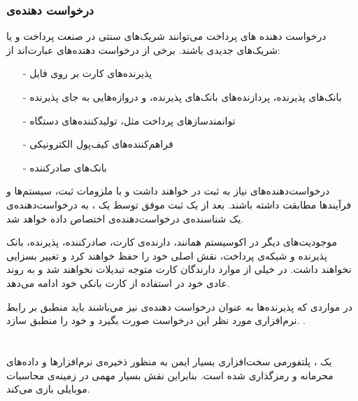\documentclass[oneside]{report}
\begin{document}
\subsubsection{درخواست دهنده‌ی     {\small {}}}
درخواست دهنده ‌های 
{\normalsize {}}
پرداخت می‌توانند شریک‌های سنتی در صنعت پرداخت و یا شریک‌های جدیدی باشند. برخی از درخواست دهنده‌های 
{\normalsize {}}
عبارت‌اند از: 
\begin{itemize}
	\item[-] پذیرنده‌های کارت بر روی فایل
	\item[-]بانک‌های پذیرنده،  پردازنده‌های بانک‌های پذیرنده،  و دروازه‌هایی به جای پذیرنده
	\item[-]توانمندسازهای پرداخت مثل، 
	تولیدکننده‌های دستگاه
	{\normalsize {}}
	\item[-]فراهم‌کننده‌های کیف‌پول الکترونیکی
	\item[-] بانک‌های صادرکننده 
\end{itemize}
درخواست‌دهنده‌های 
{\normalsize {}}
نیاز به ثبت در 
{\normalsize {}}
خواهند داشت و با ملزومات ثبت،  سیستم‌ها و فرآیندها مطابقت داشته باشند. بعد از یک ثبت موفق توسط یک 
{\normalsize {}}
، به درخواست‌دهنده‌ی 
{\normalsize {}}
یک شناسنده‌ی درخواست‌دهنده‌ی 
{\normalsize {}}
اختصاص داده خواهد شد. 

موجودیت‌‌های دیگر در اکوسیستم 
			{\normalsize {}}
همانند،   دارنده‌ی کارت،   صادرکننده، پذیرنده،   بانک پذیرنده و شبکه‌ی پرداخت، نقش اصلی خود را حفظ خواهند کرد و تغییر بسزایی نخواهند داشت. در خیلی از موارد دارندگان کارت متوجه تبدیلات  
{\normalsize {}}
نخواهند شد و به روند عادی خود در استفاده از کارت بانکی خود ادامه می‌دهد.

در مواردی که پذیرنده‌ها به عنوان درخواست دهنده‌ی 
{\normalsize {}}
نیز می‌باشند باید منطبق بر رابط نرم‌افزاری
{\normalsize {}}
مورد نظر این درخواست صورت بگیرد و خود را منطبق سازد.
\cite{emvframework}.

\section{{\large {}}}
یک 
{\normalsize {}}
، پلتفورمی سخت‌افزاری بسیار ایمن به منظور ذخیره‌ی نرم‌افزارها و داده‌های محرمانه و رمزگذاری شده است. بنابراین 
{\normalsize {}}
نقش بسیار مهمی در زمینه‌ی محاسبات موبایلی 
بازی می‌کند.
\end{document}
